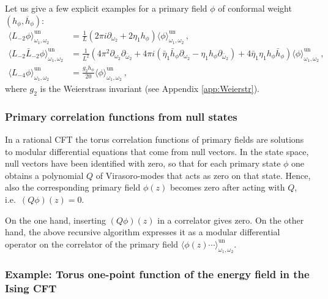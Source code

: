 \documentclass[11pt,a4paper]{article}
\numberwithin{equation}{section}
\begin{document}
Let us give a few explicit examples for a primary field $\phi$ of conformal weight $(h_\phi,\overline h_{\phi})$:
%
\begin{align}
     \big\langle L_{-2}\phi\big\rangle^{\mathrm{un}}_{\omega_1,\omega_2} &= \frac{1}{L}\left(2\pi i \partial_{\omega_2} 
     + 2\eta_1 h_\phi\right) \big\langle\phi\big\rangle^{\mathrm{un}}_{\omega_1,\omega_2}\,,\label{eq:L-2_1pt}
     \nonumber \\
    \big\langle L_{-2}\bar{L}_{-2}\phi\big\rangle^{\mathrm{un}}_{\omega_1,\omega_2} &= \frac{1}{L^2}\left(4\pi^2 \partial_{\omega_2}
    \partial_{\bar{\omega}_2}  + 4\pi i\left( \bar{\eta}_1 \bar{h}_\phi\partial_{\omega_2}  
    -  \eta_1 h_\phi\partial_{\bar{\omega}_2}\right) + 4\bar{\eta}_1\eta_1 h_\phi \bar{h}_\phi\right) \big\langle\phi\big\rangle^{\mathrm{un}}_{\omega_1,\omega_2}\,,
    \nonumber \\
    \big\langle L_{-4}\phi\big\rangle^{\mathrm{un}}_{\omega_1,\omega_2} &= \frac{g_2 h_\phi}{20} \big\langle\phi\big\rangle^{\mathrm{un}}_{\omega_1,\omega_2}  ~, 
\end{align}
%
where $g_2$ is the Weierstrass invariant (see Appendix \ref{app:Weierstr}).



\subsubsection{Primary correlation functions from null states}\label{sec:modDiffEq}


In a rational CFT the torus correlation functions of primary fields are solutions to modular differential equations that come from null vectors.
In the state space, null vectors have been identified with zero, so that for each primary state $\phi$ one obtains a polynomial $Q$ of Virasoro-modes that acts as zero on that state. Hence, also the corresponding primary field $\phi(z)$ becomes zero after acting with $Q$, i.e.\ $(Q\phi)(z)=0$. 

On the one hand, inserting $(Q\phi)(z)$ in a correlator gives zero. On the other hand, the above recursive algorithm expresses it as a modular differential operator on the correlator of the primary field $\langle \phi(z) \cdots \rangle_{\omega_1,\omega_2}^\mathrm{un}$.


\subsubsection*{Example: Torus one-point function of the energy field in the Ising CFT}\label{sec:1ptEpsilon}
\end{document}
